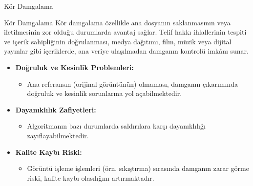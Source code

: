 \documentclass[aspectratio=169,xcolor={dvipsnames}]{beamer}
\begin{document}
\begin{frame}{Kör Damgalama}
    \begin{block}{Kör Damgalama}
      Kör damgalama özellikle ana dosyanın saklanmasının veya iletilmesinin zor olduğu durumlarda avantaj sağlar. Telif hakkı ihlallerinin tespiti ve içerik sahipliğinin doğrulanması, medya dağıtımı, film, müzik veya dijital yayınlar gibi içeriklerde, ana veriye ulaşılmadan damganın kontrolü imkânı sunar.  
    \end{block}

    \begin{itemize}
        \item \textbf{Doğruluk ve Kesinlik Problemleri:}
        \begin{itemize}
            \item Ana referansın (orijinal görüntünün) olmaması, damganın çıkarımında doğruluk ve kesinlik sorunlarına yol açabilmektedir.
        \end{itemize}
              
        \item \textbf{Dayanıklılık Zafiyetleri:}
        \begin{itemize}
            \item Algoritmanın bazı durumlarda saldırılara karşı dayanıklılığı zayıflayabilmektedir.
        \end{itemize}
        
        
        \item \textbf{Kalite Kaybı Riski:}
        \begin{itemize}
            \item Görüntü işleme işlemleri (örn. sıkıştırma) sırasında damganın zarar görme riski, kalite kaybı olasılığını artırmaktadır.
        \end{itemize}
    \end{itemize}
\end{frame}
\end{document}

